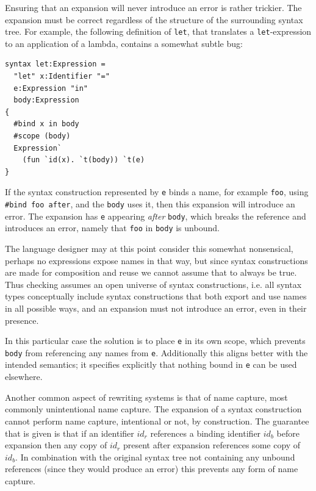 \documentclass{kththesis}
\begin{document}
Ensuring that an expansion will never introduce an error is rather trickier. The expansion must be correct regardless of the structure of the surrounding syntax tree. For example, the following definition of \texttt{let}, that translates a \texttt{let}-expression to an application of a lambda, contains a somewhat subtle bug:

\begin{verbatim}
syntax let:Expression =
  "let" x:Identifier "="
  e:Expression "in"
  body:Expression
{
  #bind x in body
  #scope (body)
  Expression`
    (fun `id(x). `t(body)) `t(e)
}
\end{verbatim}

If the syntax construction represented by \texttt{e} binds a name, for example \texttt{foo}, using \texttt{#bind foo after}, and the \texttt{body} uses it, then this expansion will introduce an error. The expansion has \texttt{e} appearing \emph{after} \texttt{body}, which breaks the reference and introduces an error, namely that \texttt{foo} in \texttt{body} is unbound.

The language designer may at this point consider this somewhat nonsensical, perhaps no expressions expose names in that way, but since syntax constructions are made for composition and reuse we cannot assume that to always be true. Thus checking assumes an open universe of syntax constructions, i.e. all syntax types conceptually include syntax constructions that both export and use names in all possible ways, and an expansion must not introduce an error, even in their presence.

In this particular case the solution is to place \texttt{e} in its own scope, which prevents \texttt{body} from referencing any names from \texttt{e}. Additionally this aligns better with the intended semantics; it specifies explicitly that nothing bound in \texttt{e} can be used elsewhere.

Another common aspect of rewriting systems is that of name capture, most commonly unintentional name capture. The expansion of a syntax construction cannot perform name capture, intentional or not, by construction. The guarantee that is given is that if an identifier $id_r$ references a binding identifier $id_b$ before expansion then any copy of $id_r$ present after expansion references some copy of $id_b$. In combination with the original syntax tree not containing any unbound references (since they would produce an error) this prevents any form of name capture.
\end{document}
